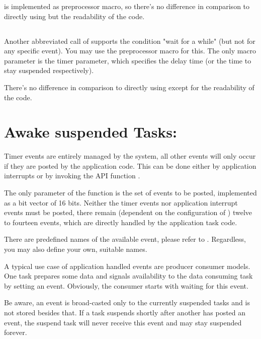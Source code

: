  is implemented as preprocessor macro, so
there's no difference in comparison to directly using
 but the readability of the code.


\subsection{}

Another abbreviated call of  supports the
condition "wait for a while" (but not for any specific event). You may use
the preprocessor macro  for this. The only macro
parameter is the timer parameter, which specifies the delay time (or the
time to stay suspended respectively).

There's no difference in comparison to directly using
 except for the readability of the code.


\section{Awake suspended Tasks: }

Timer events are entirely managed by the system, all other events will
only occur if they are posted by the application code. This can be done
either by application interrupts or by invoking the API function
.

The only parameter of the function is the set of events to be posted,
implemented as a bit vector of 16 bits. Neither the timer events nor
application interrupt events must be posted, there remain (dependent on
the configuration of \rtos{}) twelve to fourteen events, which are
directly handled by the application task code.

There are predefined names of the available event, please refer to
. Regardless, you may also define your own, suitable names.

A typical use case of application handled events are producer consumer
models. One task prepares some data and signals availability to the data
consuming task by setting an event. Obviously, the consumer starts with
waiting for this event.

Be aware, an event is broad-casted only to the currently suspended tasks
and is not stored besides that. If a task suspends shortly after another
has posted an event, the suspend task will never receive this event and
may stay suspended forever.


